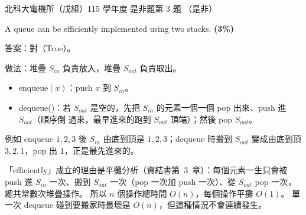 \begin{pastexam}[label={px:ntut-115-ee-ds-03}]{北科大電機所（戊組）115 學年度 是非題第 3 題}
（是非）

A queue can be efficiently implemented using two stacks. \textbf{(3\%)}
\end{pastexam}

\begin{pastsoln}
答案：對（True）。

做法：堆疊 $S_{\mathit{in}}$ 負責放入，堆疊 $S_{\mathit{out}}$ 負責取出。
\begin{itemize}
\item enqueue$(x)$：push $x$ 到 $S_{\mathit{in}}$。
\item dequeue()：若 $S_{\mathit{out}}$ 是空的，先把 $S_{\mathit{in}}$ 的元素一個一個 pop 出來、push 進 $S_{\mathit{out}}$（順序倒
過來，最早進來的跑到 $S_{\mathit{out}}$ 頂端）；然後 pop $S_{\mathit{out}}$。
\end{itemize}
例如 enqueue $1, 2, 3$ 後 $S_{\mathit{in}}$ 由底到頂是 $1, 2, 3$；dequeue 時搬到 $S_{\mathit{out}}$ 變成由底到頂 $3, 2, 1$，pop
出 $1$，正是最先進來的。

「efficiently」成立的理由是平攤分析（資結書第~3~章）：每個元素一生只會被 push 進 $S_{\mathit{in}}$ 一次、搬到
$S_{\mathit{out}}$ 一次（pop 一次加 push 一次）、從 $S_{\mathit{out}}$ pop 一次，總共常數次堆疊操作。 所以 $n$ 個操作總時間
$O(n)$，每個操作平攤 $O(1)$。 單一次 dequeue 碰到要搬家時最壞是 $O(n)$，但這種情況不會連續發生。
\end{pastsoln}
